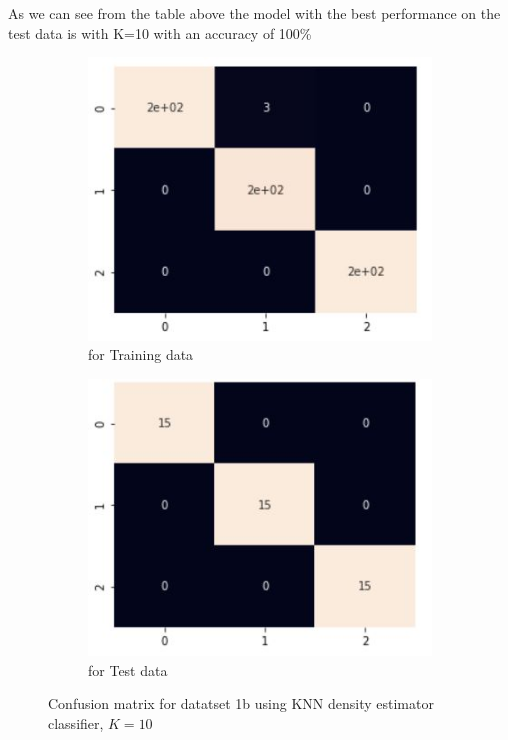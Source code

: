 \documentclass[11pt]{article}
\begin{document}
As we can see from the table above the model with the best performance on the test data is with  K=10 with an accuracy of 100\% 
\begin{figure}[h]
\centering
	\begin{subfigure}[b]{0.45\textwidth}
	\centering
	\includegraphics[scale=0.6]{dataset1b_knnde_hm_train.jpg}
	\caption{for Training data}
	\label{fig:fig2.2.3.1}
	\end{subfigure}
	\hfill
	\begin{subfigure}[b]{0.45\textwidth}
	\centering
	\includegraphics[scale=0.6]{dataset1b_knnde_hm_test.jpg}
	\caption{for Test data}
	\label{fig:fig2.2.3.2}
	\end{subfigure}
\caption{Confusion matrix for datatset 1b using KNN density estimator classifier, $K =10$}
\label{fig:fig1.2.1}
\end{figure}
\end{document}
